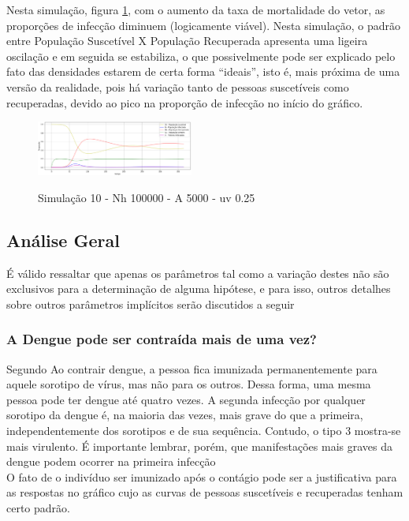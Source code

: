 \documentclass[conference]{IEEEtran}
\begin{document}
Nesta simulação, figura \ref{fig:s10}, com o aumento da taxa de mortalidade do vetor, as proporções de infecção diminuem (logicamente viável). Nesta simulação, o padrão entre População Suscetível X População Recuperada apresenta uma ligeira oscilação e em seguida se estabiliza, o que possivelmente pode ser explicado pelo fato das densidades estarem de certa forma “ideais”, isto é, mais próxima de uma versão da realidade, pois há variação tanto de pessoas suscetíveis como recuperadas, devido ao pico na proporção de infecção no início do gráfico.
\\

\begin{figure}[!ht]
  \caption{Simulação 10 - Nh 100000 - A 5000 - uv 0.25}
  \includegraphics[width=0.46\textwidth]{Graf10.png}
  \label{fig:s10}
\end{figure}

\subsection{Análise Geral}

É válido ressaltar que apenas os parâmetros tal como a variação destes não são exclusivos para a determinação de alguma hipótese, e para isso, outros detalhes sobre outros parâmetros implícitos serão discutidos a seguir\\

\subsubsection{A Dengue pode ser contraída mais de uma vez?}  
 
Segundo \cite{espiritosanto} Ao contrair dengue, a pessoa fica imunizada permanentemente para aquele sorotipo de vírus, mas não para os outros. Dessa forma, uma mesma pessoa pode ter dengue até quatro vezes. A segunda infecção por qualquer sorotipo da dengue é, na maioria das vezes, mais grave do que a primeira, independentemente dos sorotipos e de sua sequência. Contudo, o tipo 3 mostra-se mais virulento. É importante lembrar, porém, que manifestações mais graves da dengue podem ocorrer na primeira infecção\\

O fato de o indivíduo ser imunizado após o contágio pode ser a justificativa para as respostas no gráfico cujo as curvas de pessoas suscetíveis e recuperadas tenham certo padrão.
\end{document}
